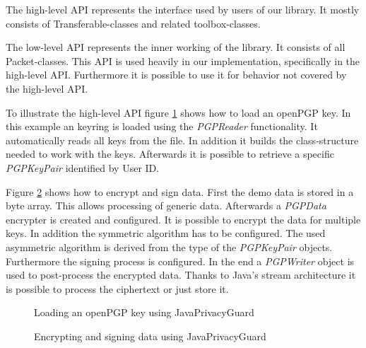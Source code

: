 The high-level API represents the interface used by users of our library. It mostly consists of Transferable-classes and related toolbox-classes.

The low-level API represents the inner working of the library. It consists of all Packet-classes. This API is used heavily in our implementation, specifically in the high-level API. Furthermore it is possible to use it for behavior not covered by the high-level API.


To illustrate the high-level API figure \ref{fig:jpg:key} shows how to load an openPGP key. In this example an keyring is loaded using the \textit{PGPReader} functionality. It automatically reads all keys from the file. In addition it builds the class-structure needed to work with the keys. Afterwards it is possible to retrieve a specific \textit{PGPKeyPair} identified by User ID.

Figure \ref{fig:jpg:enc} shows how to encrypt and sign data. First the demo data is stored in a byte array. This allows processing of generic data. Afterwards a \textit{PGPData} encrypter is created and configured. It is possible to encrypt the data for multiple keys. In addition the symmetric algorithm has to be configured. The used asymmetric algorithm is derived from the type of the \textit{PGPKeyPair} objects. Furthermore the signing process is configured.  In the end a \textit{PGPWriter} object is used to post-process the encrypted data. Thanks to Java's stream architecture it is possible to process the ciphertext or just store it.

\begin{figure}[p]
	\centering
	
	\caption{Loading an openPGP key using JavaPrivacyGuard}
	\label{fig:jpg:key}
\end{figure}

\begin{figure}[p]
	\centering
	
	\caption{Encrypting and signing data using JavaPrivacyGuard}
	\label{fig:jpg:enc}
\end{figure}

